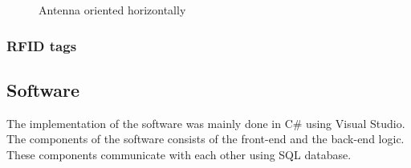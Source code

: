 \documentclass[a4paper,twoside]{article}
\begin{document}
\begin{figure}[h]
\centering
{}
\caption{Antenna oriented horizontally}
\label{antenna}
\end{figure}
\subsubsection{RFID tags}
\subsection{Software}
The implementation of the software was mainly done in C\# using Visual Studio. The components of the software consists of the front-end and the back-end logic. These components communicate with each other using SQL database.
\end{document}
